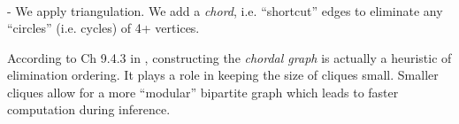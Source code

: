 \begin{frame}\frametitle{\subsubsecname}

	

	\\
	
	\pause 
	
	- We apply triangulation. We add a \emph{chord}, i.e. ``shortcut'' edges to eliminate any ``circles'' (i.e. cycles) of 4+ vertices.
	
	\pause 
	
	According to Ch 9.4.3 in \citep{koller2009probabilistic}, constructing the \emph{chordal graph} is actually a heuristic of elimination ordering. It plays a role in keeping the size of cliques small. Smaller cliques allow for a more ``modular'' bipartite graph which leads to faster computation during inference.
	
\end{frame}


